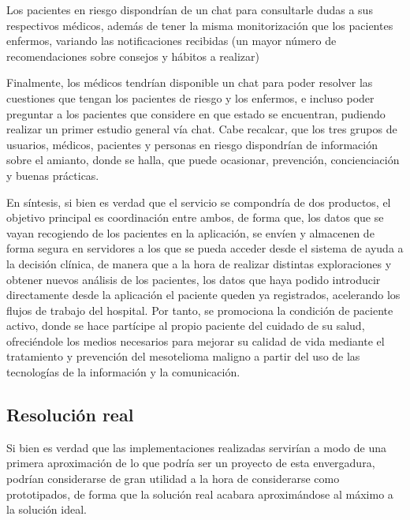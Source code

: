 \documentclass{article}
\begin{document}
Los pacientes en riesgo dispondrían de un chat para consultarle  dudas
a sus respectivos médicos, además de tener la misma monitorización que
los pacientes enfermos,  variando  las	notificaciones	recibidas  (un
mayor número de recomendaciones sobre consejos y hábitos  a  realizar)

Finalmente,  los  médicos  tendrían  disponible  un  chat  para  poder
resolver las cuestiones que tengan  los  pacientes  de	riesgo	y  los
enfermos, e incluso poder preguntar a los pacientes que  considere  en
que estado se encuentran, pudiendo realizar un primer estudio  general
vía chat.  Cabe recalcar, que los tres grupos  de  usuarios,  médicos,
pacientes y personas en riesgo dispondrían  de	información  sobre  el
amianto,  donde   se   halla,	que   puede   ocasionar,   prevención,
concienciación y buenas prácticas.

En síntesis, si bien es verdad que el servicio se  compondría  de  dos
productos, el objetivo principal es coordinación entre ambos, de forma
que, los datos	que  se  vayan	recogiendo  de	los  pacientes	en  la
aplicación, se envíen y almacenen de forma segura en servidores a  los
que se pueda acceder desde el sistema de ayuda a la decisión  clínica,
de manera que a la hora de realizar distintas exploraciones y  obtener
nuevos análisis de los pacientes, los datos que haya podido introducir
directamente desde la aplicación el paciente  queden  ya  registrados,
acelerando  los  flujos  de  trabajo  del  hospital.   Por  tanto,  se
promociona la condición de paciente activo, donde se hace partícipe al
propio paciente del cuidado  de  su  salud,  ofreciéndole  los	medios
necesarios para mejorar su calidad de vida mediante el	tratamiento  y
prevención del mesotelioma maligno a partir del uso de las tecnologías
de la información y la comunicación.

\vfill
\subsection{Resolución real}

Si bien es verdad que las implementaciones realizadas servirían a modo
de una primera aproximación de lo que podría ser un proyecto  de  esta
envergadura, podrían considerarse  de  gran  utilidad  a  la  hora  de
considerarse como prototipados, de forma que la solución real  acabara
aproximándose al máximo a la solución ideal.
\end{document}

